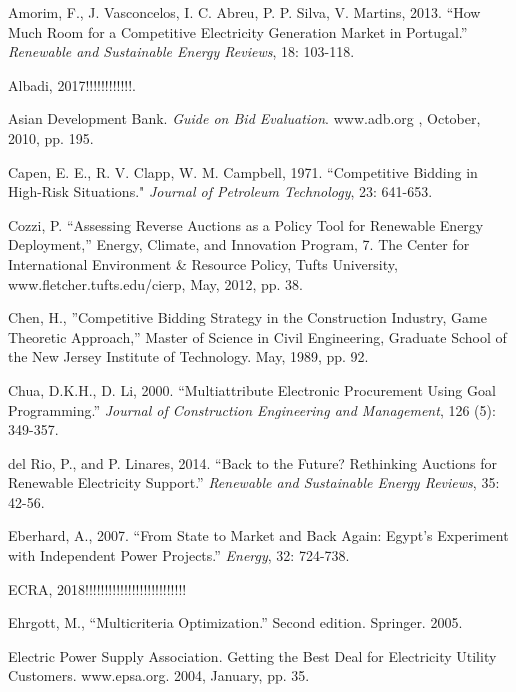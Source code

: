 \documentclass[informs]{informs3}
\begin{document}
\begin{thebibliography}{}
Amorim, F., J. Vasconcelos, I. C. Abreu, P. P. Silva, V. Martins, 2013. “How Much Room for a Competitive Electricity Generation Market in Portugal.” \textit{Renewable and Sustainable Energy Reviews}, 18: 103-118.	
	
Albadi, 2017!!!!!!!!!!!!.	
	
	
Asian Development Bank. \textit{Guide on Bid Evaluation}. www.adb.org , October, 2010, pp. 195. 

Capen, E. E., R. V. Clapp, W. M. Campbell, 1971. “Competitive Bidding in High-Risk Situations." \textit{Journal of Petroleum Technology}, 23: 641-653.

Cozzi, P. “Assessing Reverse Auctions as a Policy Tool for Renewable Energy Deployment,”  Energy, Climate, and Innovation Program, 7. The Center for International Environment \& Resource Policy, Tufts University, www.fletcher.tufts.edu/cierp, May, 2012, pp. 38.

Chen, H., ”Competitive Bidding Strategy in the Construction Industry, Game Theoretic Approach,” Master of Science in Civil Engineering, Graduate School of the New Jersey Institute of Technology. May, 1989, pp. 92.

Chua, D.K.H., D. Li, 2000. “Multiattribute Electronic Procurement Using Goal Programming.” \textit{Journal of Construction Engineering and Management}, 126 (5): 349-357.

del Rio, P., and P. Linares, 2014. “Back to the Future? Rethinking Auctions for Renewable Electricity Support.” \textit{Renewable and Sustainable Energy Reviews}, 35: 42-56.

Eberhard, A., 2007. “From State to Market and Back Again: Egypt’s Experiment with Independent Power Projects.” \textit{Energy}, 32: 724-738.

ECRA, 2018!!!!!!!!!!!!!!!!!!!!!!!!!!


Ehrgott, M., “Multicriteria Optimization.” Second edition. Springer. 2005.

Electric Power Supply Association. Getting the Best Deal for Electricity Utility Customers. www.epsa.org. 2004, January, pp. 35.



\end{thebibliography}
\end{document}
